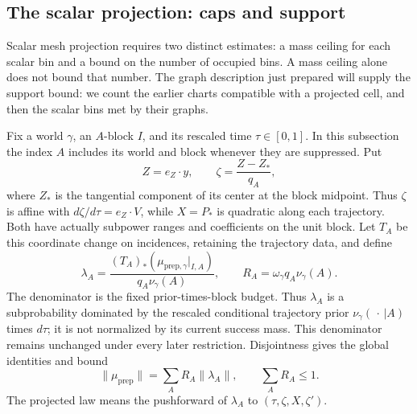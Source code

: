 \subsection{The scalar projection: caps and support}

Scalar mesh projection requires two distinct estimates: a mass ceiling
for each scalar bin and a bound on the number of occupied bins.
A mass ceiling alone does not bound that number.  The graph
description just prepared will supply the support bound: we count the
earlier charts compatible with a projected cell, and then the scalar
bins met by their graphs.

Fix a world \(\gamma\), an \(A\)-block \(I\), and its rescaled time
\(\tau\in[0,1]\).  In this subsection the index \(A\) includes its
world and block whenever they are suppressed.  Put
\begin{equation}
 \label{a08:projected-coordinates}
 Z=e_Z\cdot y,\qquad
 \zeta=\frac{Z-Z_*}{q_A},
\end{equation}
where \(Z_*\) is the tangential component of its center at the block
midpoint.  Thus \(\zeta\) is affine with
\(d\zeta/d\tau=e_Z\cdot V\), while \(X=P_*\) is quadratic along each
trajectory.  Both have actually subpower ranges and coefficients on
the unit block.  Let \(T_A\) be this coordinate change on incidences,
retaining the trajectory data, and define
\begin{equation}
 \label{a08:A-law}
 \lambda_A
   =\frac{(T_A)_*(\mu_{\mathrm{prep},\gamma}|_{I,A})}
          {q_A\nu_\gamma(A)},\qquad
 R_A=\omega_\gamma q_A\nu_\gamma(A).
\end{equation}
The denominator is the fixed prior-times-block budget.  Thus
\(\lambda_A\) is a subprobability dominated by the rescaled
conditional trajectory prior \(\nu_\gamma(\,\cdot\,|A)\) times
\(d\tau\); it is not normalized by its current success mass.
This denominator remains unchanged under every later restriction.
Disjointness gives
the global identities and bound
\begin{equation}
 \label{a08:prepared-mass-budget}
 \|\mu_{\mathrm{prep}}\|
    =\sum_A R_A\|\lambda_A\|,\qquad \sum_A R_A\le1.
\end{equation}
The projected law means the pushforward of \(\lambda_A\) to
\((\tau,\zeta,X,\zeta')\).


